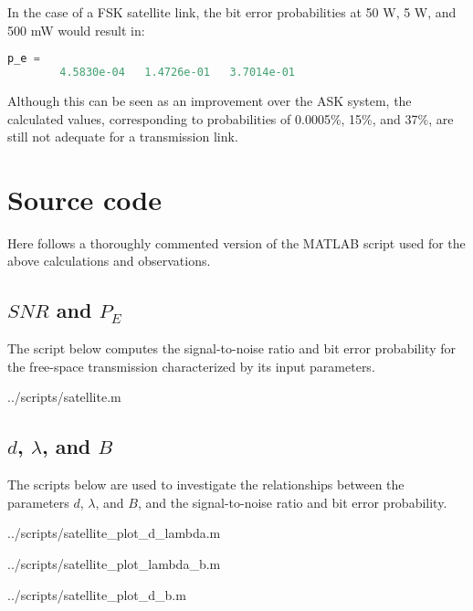 In the case of a FSK satellite link, the bit error probabilities at 50 W, 5 W, and 500 mW would result in:

\begin{lstlisting}[language=Octave]
    p_e =
        4.5830e-04   1.4726e-01   3.7014e-01
\end{lstlisting}

Although this can be seen as an improvement over the ASK system, the calculated values, corresponding to probabilities of 0.0005\%, 15\%, and 37\%, are still not adequate for a transmission link.

\lstset{
  caption=\lstname
}

\section{Source code}
Here follows a thoroughly commented version of the MATLAB script used for the above calculations and observations.

\subsection{$SNR$ and $P_E$}
The script below computes the signal-to-noise ratio and bit error probability for the free-space transmission characterized by its input parameters.

\begin{lstinputlisting}[language=Octave]{../scripts/satellite.m}
\end{lstinputlisting}


\subsection{$d$, $\lambda$, and $B$}
The scripts below are used to investigate the relationships between the parameters $d$, $\lambda$, and $B$, and the signal-to-noise ratio and bit error probability.

\begin{lstinputlisting}[language=Octave]{../scripts/satellite_plot_d_lambda.m}
\end{lstinputlisting}

\begin{lstinputlisting}[language=Octave]{../scripts/satellite_plot_lambda_b.m}
\end{lstinputlisting}

\begin{lstinputlisting}[language=Octave]{../scripts/satellite_plot_d_b.m}
\end{lstinputlisting}


